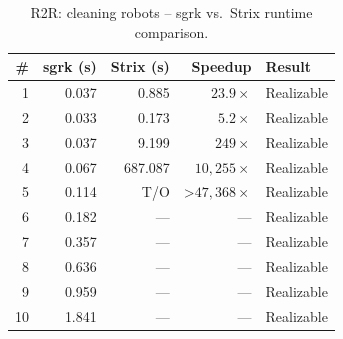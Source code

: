\begin{table}[htbp]
\centering
\caption{R2R: cleaning robots -- sgrk vs.\ Strix runtime comparison.}
\label{tab:R2R_cleaning_robots}
\begin{tabular}{r r r r l}
\toprule
\# & sgrk (s) & Strix (s) & Speedup & Result \\
\midrule
1 & 0.037 & 0.885 & $23.9\times$ & Realizable \\
2 & 0.033 & 0.173 & $5.2\times$ & Realizable \\
3 & 0.037 & 9.199 & $249\times$ & Realizable \\
4 & 0.067 & 687.087 & $10,255\times$ & Realizable \\
5 & 0.114 & T/O & >$47,368\times$ & Realizable \\
6 & 0.182 & --- & --- & Realizable \\
7 & 0.357 & --- & --- & Realizable \\
8 & 0.636 & --- & --- & Realizable \\
9 & 0.959 & --- & --- & Realizable \\
10 & 1.841 & --- & --- & Realizable \\
\bottomrule
\end{tabular}
\end{table}
